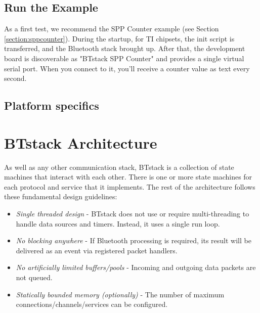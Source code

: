 \documentclass[a4paper,titlepage,oneside,12pt]{amsart} %
\begin{document}
\subsection{Run the Example}

As a first test, we recommend the SPP Counter example (see Section \ref{section:sppcounter}). During the startup, for TI chipsets, the init script is transferred, and the Bluetooth stack brought up. After that, the development board is discoverable as "BTstack SPP Counter" and provides a single virtual serial port. When you connect to it, you'll receive a counter value as text every second.

 
\subsection{Platform specifics}
 



\section{BTstack Architecture}

As well as any other communication stack, BTstack is a collection of state machines that interact with each other. There is one or more state machines for each protocol and service that it implements. The rest of the architecture follows these fundamental design guidelines:

\begin{itemize}
\item \emph{Single threaded design} - BTstack does not use or require multi-threading to handle data sources and timers. Instead, it uses a single run loop.
\item \emph{No blocking anywhere} - If Bluetooth processing is required, its result will be delivered as an event via registered packet handlers.
\item \emph{No artificially limited buffers/pools} - Incoming and outgoing data packets are not queued.
\item \emph{Statically bounded memory (optionally)} - The number of maximum connections/channels/services can be configured.
\end{itemize}
\end{document}
